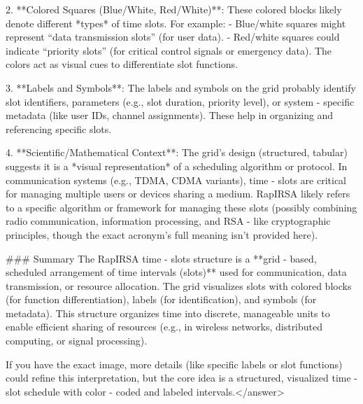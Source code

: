 2. **Colored Squares (Blue/White, Red/White)**: These colored blocks likely denote different *types* of time slots. For example:  
   - Blue/white squares might represent “data transmission slots” (for user data).  
   - Red/white squares could indicate “priority slots” (for critical control signals or emergency data).  
   The colors act as visual cues to differentiate slot functions.  

3. **Labels and Symbols**: The labels and symbols on the grid probably identify slot identifiers, parameters (e.g., slot duration, priority level), or system - specific metadata (like user IDs, channel assignments). These help in organizing and referencing specific slots.  

4. **Scientific/Mathematical Context**: The grid’s design (structured, tabular) suggests it is a *visual representation* of a scheduling algorithm or protocol. In communication systems (e.g., TDMA, CDMA variants), time - slots are critical for managing multiple users or devices sharing a medium. RapIRSA likely refers to a specific algorithm or framework for managing these slots (possibly combining radio communication, information processing, and RSA - like cryptographic principles, though the exact acronym’s full meaning isn’t provided here).  


### Summary  
The RapIRSA time - slots structure is a **grid - based, scheduled arrangement of time intervals (slots)** used for communication, data transmission, or resource allocation. The grid visualizes slots with colored blocks (for function differentiation), labels (for identification), and symbols (for metadata). This structure organizes time into discrete, manageable units to enable efficient sharing of resources (e.g., in wireless networks, distributed computing, or signal processing).  

If you have the exact image, more details (like specific labels or slot functions) could refine this interpretation, but the core idea is a structured, visualized time - slot schedule with color - coded and labeled intervals.</answer>